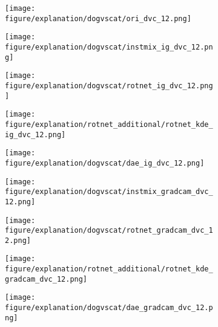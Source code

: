 \documentclass{article} \usepackage{iclr2021_conference,times}
\begin{document}
\begin{figure}[h!]
\begin{subfigure}{.11\textwidth}
  \centering
  \texttt{[image: figure/explanation/dogvscat/ori\_dvc\_12.png]}
\end{subfigure}
\hspace{-2mm}
\begin{subfigure}{.11\textwidth}
  \centering
  \texttt{[image: figure/explanation/dogvscat/instmix\_ig\_dvc\_12.png]}
\end{subfigure}
\hspace{-2mm}
\begin{subfigure}{.11\textwidth}
  \centering
  \texttt{[image: figure/explanation/dogvscat/rotnet\_ig\_dvc\_12.png]}
\end{subfigure}
\hspace{-2mm}
\begin{subfigure}{.11\textwidth}
  \centering
  \texttt{[image: figure/explanation/rotnet\_additional/rotnet\_kde\_ig\_dvc\_12.png]}
\end{subfigure}
\hspace{-2mm}
\begin{subfigure}{.11\textwidth}
  \centering
  \texttt{[image: figure/explanation/dogvscat/dae\_ig\_dvc\_12.png]}
\end{subfigure}
\hspace{-2mm}
\begin{subfigure}{.11\textwidth}
  \centering
  \texttt{[image: figure/explanation/dogvscat/instmix\_gradcam\_dvc\_12.png]}
\end{subfigure}
\hspace{-2mm}
\begin{subfigure}{.11\textwidth}
  \centering
  \texttt{[image: figure/explanation/dogvscat/rotnet\_gradcam\_dvc\_12.png]}
\end{subfigure}
\hspace{-2mm}
\begin{subfigure}{.11\textwidth}
  \centering
  \texttt{[image: figure/explanation/rotnet\_additional/rotnet\_kde\_gradcam\_dvc\_12.png]}
\end{subfigure}
\hspace{-2mm}
\begin{subfigure}{.11\textwidth}
  \centering
  \texttt{[image: figure/explanation/dogvscat/dae\_gradcam\_dvc\_12.png]}
\end{subfigure}\\
\begin{subfigure}{.11\textwidth}

\end{subfigure}
\end{figure}
\end{document}
